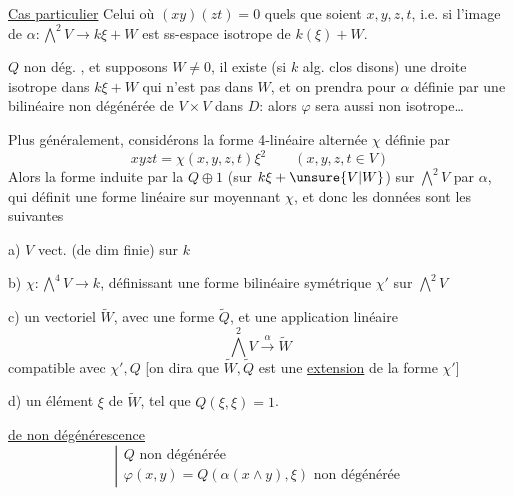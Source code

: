 \uline{Cas particulier} Celui où $(xy)(zt)=0$ quels que soient $x,y,z,t$, i.e.
\margin{[i.e. $(H^1)\unsure{H^3|(H^1)^3|{}^{\deleted{\otimes}3}}=0$ dans $H^4$ !]}
si l'image de $\alpha:\bigwedge^2V\longrightarrow k\xi+W$ est   ss-espace isotrope de $k(\xi)+W$.

$Q$ non dég. , et supposons $W\neq0$, il existe (si $k$  alg. clos disons) une droite isotrope  dans $k\xi+W$ qui n'est pas dans $W$, et on prendra pour $\alpha$  définie par une  bilinéaire  non dégénérée  de $V\times V$ dans $D$: alors $\varphi$ sera aussi non isotrope\ldots


Plus généralement, considérons la forme 4-linéaire alternée $\chi$ définie par
\[
xyzt=\chi(x,y,z,t)\xi^2\qquad(x,y,z,t\in V)
\]
Alors la forme  induite par la  $Q\oplus1$ (sur $k\xi+\unsure{V|W}$) sur $\bigwedge^2 V$ par $\alpha$, qui définit une  forme linéaire sur
moyennant $\chi$, et donc les données sont les suivantes

a) $V$ vect. (de dim finie) sur $k$


b) $\chi:\bigwedge^4V\longrightarrow k$, définissant une forme bilinéaire symétrique $\chi'$ sur $\bigwedge^2V$

c) un vectoriel $\widetilde W$, avec une forme  $\widetilde Q$, et une application linéaire
\[
\bigwedge^2V\xrightarrow{\alpha}\widetilde W
\]
compatible avec $\chi',Q$ [on dira que $\widetilde W,\widetilde Q$ est une \uline{extension} de la forme $\chi'$]

d) un élément $\xi$ de $\widetilde W$, tel que $Q(\xi,\xi)=1$.

\uline{ de non dégénérescence}
\[
\left|\begin{array}{l}
Q\text{ non dégénérée}\\
\varphi(x,y)=Q(\alpha(x\wedge y),\xi)\text{ non dégénérée}
\end{array}\right.
\]
